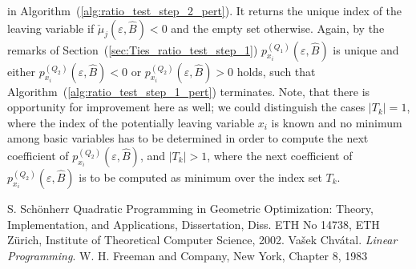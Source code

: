 \documentclass[a4paper]{article}
\newcommand{\px}[3]{\ensuremath{p_{x_{#1}}^{(#2)}(\varepsilon, #3)}}
\begin{document}
in Algorithm~(\ref{alg:ratio_test_step_2_pert}). It returns the unique index of
the leaving variable if $\check{\mu}_{j}(\varepsilon, \hat{B})<0$ and the empty
set otherwise.
Again, by the remarks of
Section~(\ref{sec:Ties_ratio_test_step_1}) \px{i}{Q_{1}}{\hat{B}} is unique and
either $\px{i}{Q_{2}}{\hat{B}} < 0$ or $\px{i}{Q_{2}}{\hat{B}} > 0$
holds, such that Algorithm~(\ref{alg:ratio_test_step_1_pert}) terminates.
Note, that there is opportunity for improvement here as well;
we could distinguish the cases $\left|T_{k}\right|=1$, where the index of
the potentially leaving variable $x_{i}$ is known and no minimum among basic
variables has to be determined in order to compute the next coefficient of
\px{i}{Q_{2}}{\hat{B}}, and
$\left|T_{k}\right|>1$, where the next coefficient of
\px{i}{Q_{2}}{\hat{B}} is to be computed as minimum over the index set $T_{k}$.

\begin{thebibliography}{99}
 S. Sch\"{o}nherr Quadratic Programming in Geometric Optimization:
Theory, Implementation, and Applications, Dissertation, Diss. ETH No 14738, ETH
Z\"{u}rich, Institute of Theoretical Computer Science, 2002.
 Va\v{s}ek Chv\'{a}tal. \textit{Linear Programming}. W. H. Freeman and Company,
New York, Chapter 8, 1983 
\end{thebibliography}
\end{document}
